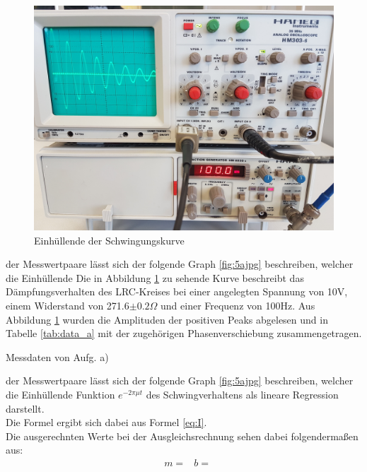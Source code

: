   \begin{figure}[H]
    \includegraphics[width=\textwidth]{images/5a.jpg}
    \centering
    \caption{Einhüllende der Schwingungskurve}
    \label{fig:5a}
  \end{figure}

  \justifying der Messwertpaare lässt sich der folgende Graph \ref{fig:5ajpg} beschreiben, welcher die Einhüllende 
  Die in Abbildung \ref{fig:5a} zu sehende Kurve beschreibt das Dämpfungsverhalten des LRC-Kreises bei einer angelegten Spannung von 
  10V, einem Widerstand von 271.6$\pm0.2\Omega$ und einer Frequenz von 100Hz. Aus Abbildung \ref{fig:5a} wurden die Amplituden der positiven Peaks
  abgelesen und in Tabelle \ref{tab:data_a} mit der zugehörigen Phasenverschiebung zusammengetragen.

  \begin{table}[H]
        \centering
        \caption{Messdaten von Aufg. a)}
         
        \label{tab:data_a}
  \end{table}

  \justifying der Messwertpaare lässt sich der folgende Graph \ref{fig:5ajpg} beschreiben, welcher die Einhüllende 
  Funktion $e^{-2\pi\mu t}$ des Schwingverhaltens als lineare Regression darstellt.\\
  Die Formel ergibt sich dabei aus Formel \eqref{eq:I}.\\
  Die ausgerechnten Werte bei der Ausgleichsrechnung sehen dabei folgendermaßen aus:
  \begin{align}
      &m=\text{}
      &b=\text{}
  \end{align}

